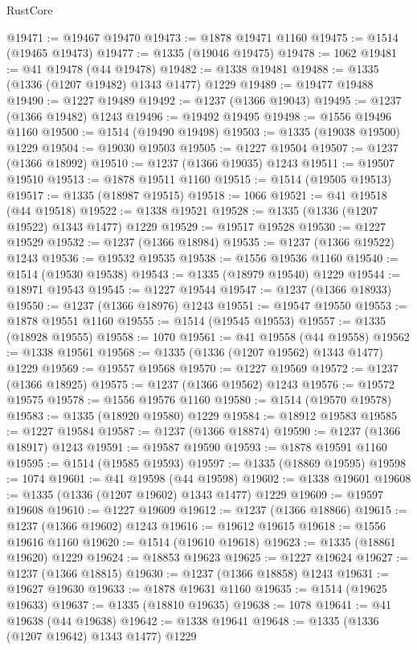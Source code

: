 \begin{lexlean}{RustCore}
\begin{coremodule}
@19471 := @19467 @19470
@19473 := @1878 @19471 @1160
@19475 := @1514 (@19465 @19473)
@19477 := @1335 (@19046 @19475)
@19478 := 1062
@19481 := @41 @19478 (@44 @19478)
@19482 := @1338 @19481
@19488 := @1335 (@1336 (@1207 @19482) @1343 @1477) @1229
@19489 := @19477 @19488
@19490 := @1227 @19489
@19492 := @1237 (@1366 @19043)
@19495 := @1237 (@1366 @19482) @1243
@19496 := @19492 @19495
@19498 := @1556 @19496 @1160
@19500 := @1514 (@19490 @19498)
@19503 := @1335 (@19038 @19500) @1229
@19504 := @19030 @19503
@19505 := @1227 @19504
@19507 := @1237 (@1366 @18992)
@19510 := @1237 (@1366 @19035) @1243
@19511 := @19507 @19510
@19513 := @1878 @19511 @1160
@19515 := @1514 (@19505 @19513)
@19517 := @1335 (@18987 @19515)
@19518 := 1066
@19521 := @41 @19518 (@44 @19518)
@19522 := @1338 @19521
@19528 := @1335 (@1336 (@1207 @19522) @1343 @1477) @1229
@19529 := @19517 @19528
@19530 := @1227 @19529
@19532 := @1237 (@1366 @18984)
@19535 := @1237 (@1366 @19522) @1243
@19536 := @19532 @19535
@19538 := @1556 @19536 @1160
@19540 := @1514 (@19530 @19538)
@19543 := @1335 (@18979 @19540) @1229
@19544 := @18971 @19543
@19545 := @1227 @19544
@19547 := @1237 (@1366 @18933)
@19550 := @1237 (@1366 @18976) @1243
@19551 := @19547 @19550
@19553 := @1878 @19551 @1160
@19555 := @1514 (@19545 @19553)
@19557 := @1335 (@18928 @19555)
@19558 := 1070
@19561 := @41 @19558 (@44 @19558)
@19562 := @1338 @19561
@19568 := @1335 (@1336 (@1207 @19562) @1343 @1477) @1229
@19569 := @19557 @19568
@19570 := @1227 @19569
@19572 := @1237 (@1366 @18925)
@19575 := @1237 (@1366 @19562) @1243
@19576 := @19572 @19575
@19578 := @1556 @19576 @1160
@19580 := @1514 (@19570 @19578)
@19583 := @1335 (@18920 @19580) @1229
@19584 := @18912 @19583
@19585 := @1227 @19584
@19587 := @1237 (@1366 @18874)
@19590 := @1237 (@1366 @18917) @1243
@19591 := @19587 @19590
@19593 := @1878 @19591 @1160
@19595 := @1514 (@19585 @19593)
@19597 := @1335 (@18869 @19595)
@19598 := 1074
@19601 := @41 @19598 (@44 @19598)
@19602 := @1338 @19601
@19608 := @1335 (@1336 (@1207 @19602) @1343 @1477) @1229
@19609 := @19597 @19608
@19610 := @1227 @19609
@19612 := @1237 (@1366 @18866)
@19615 := @1237 (@1366 @19602) @1243
@19616 := @19612 @19615
@19618 := @1556 @19616 @1160
@19620 := @1514 (@19610 @19618)
@19623 := @1335 (@18861 @19620) @1229
@19624 := @18853 @19623
@19625 := @1227 @19624
@19627 := @1237 (@1366 @18815)
@19630 := @1237 (@1366 @18858) @1243
@19631 := @19627 @19630
@19633 := @1878 @19631 @1160
@19635 := @1514 (@19625 @19633)
@19637 := @1335 (@18810 @19635)
@19638 := 1078
@19641 := @41 @19638 (@44 @19638)
@19642 := @1338 @19641
@19648 := @1335 (@1336 (@1207 @19642) @1343 @1477) @1229

\end{coremodule}
\end{lexlean}
